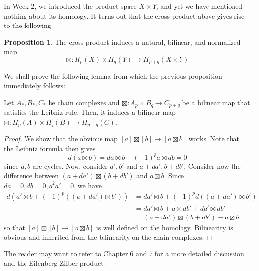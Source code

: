 \documentclass[12pt,reqno]{amsart}
\numberwithin{theorem}{section}
\theoremstyle{definition}
\theoremstyle{remark}
\numberwithin{equation}{section}
\theoremstyle{definition}
\newtheorem{prop}[theorem]{Proposition}
\begin{document}
In Week 2, we introduced the product space $X\times Y$, and yet we have mentioned nothing about its homology. It turns out that the cross product above gives rise to the following:
\begin{prop}
    The cross product induces a natural, bilinear, and normalized map $$\boxtimes : H_p(X)\times H_q(Y) \rightarrow H_{p+q}(X\times Y)$$
\end{prop}
We shall prove the following lemma from which the previous proposition immediately follows:
\begin{lemma}
    Let $A_*,B_*,C_*$ be chain complexes and $\boxtimes:A_p \times B_q \rightarrow C_{p+q}$ be a bilinear map that satisfies the Leibniz rule. Then, it induces a bilinear map $\boxtimes :H_p(A)\times H_q(B) \rightarrow H_{p+q}(C)$.
\end{lemma}
\begin{proof}
    We show that the obvious map $[a] \boxtimes [b] \rightarrow [a\boxtimes b]$ works. Note that the Leibniz formula then gives
    $$d(a\boxtimes b)= da \boxtimes b +(-1)^pa\boxtimes db = 0$$
    since $a,b$ are cycles. Now, consider $a',b'$ and $a+da', b+db'$. Consider now the difference between $(a+da')\boxtimes (b+db')$ and $a \boxtimes b$. Since $da=0,db=0,d^2a' = 0$, we have 
    \begin{align*}
        d(a'\boxtimes b + (-1)^p((a+da')\boxtimes b')) &= da'\boxtimes b + (-1)^pd((a+da')\boxtimes b') \\
        &= da'\boxtimes b +a\boxtimes db' + da'\boxtimes db' \\
        &= (a+da')\boxtimes (b+db') - a\boxtimes b
    \end{align*}
    so that $[a] \boxtimes [b] \rightarrow [a\boxtimes b]$ is well defined on the homology. Bilinearity is obvious and inherited from the bilinearity on the chain complexes.
\end{proof}
The reader may want to refer to \cite{miller} Chapter 6 and 7 for a more detailed discussion and the Eilenberg-Zilber product.
\end{document}
